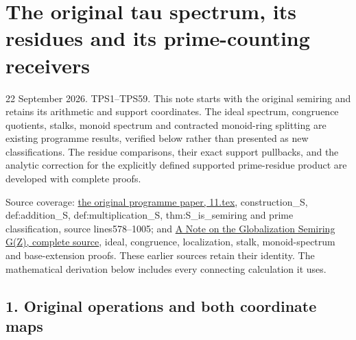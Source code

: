 \documentclass[
  10pt,
]{article}
\author{}
\date{}
\begin{document}
\section{The original tau spectrum, its residues and its prime-counting
receivers}\label{the-original-tau-spectrum-its-residues-and-its-prime-counting-receivers}

22 September 2026. TPS1--TPS59. This note starts with the original
semiring and retains its arithmetic and support coordinates. The ideal
spectrum, congruence quotients, stalks, monoid spectrum and contracted
monoid-ring splitting are existing programme results, verified below
rather than presented as new classifications. The residue comparisons,
their exact support pullbacks, and the analytic correction for the
explicitly defined supported prime-residue product are developed with
complete proofs.

Source coverage:
\href{https://github.com/KokunoYumeto/zeta-function-research-reader/blob/ac168d55cbb400a6c8926a00d67909ba65646ac5/workbenches/splitzero-tandem/branches/identity-absorber-square/sources/17555345_11.tex}{the
original programme paper, 11.tex}, construction\_S, def:addition\_S,
def:multiplication\_S, thm:S\_is\_semiring and prime classification,
source lines578--1005; and \href{globalization_note.tex}{A Note on the
Globalization Semiring G(Z), complete source}, ideal, congruence,
localization, stalk, monoid-spectrum and base-extension proofs. These
earlier sources retain their identity. The mathematical derivation below
includes every connecting calculation it uses.

\subsection{1. Original operations and both coordinate
maps}\label{original-operations-and-both-coordinate-maps}
\end{document}

